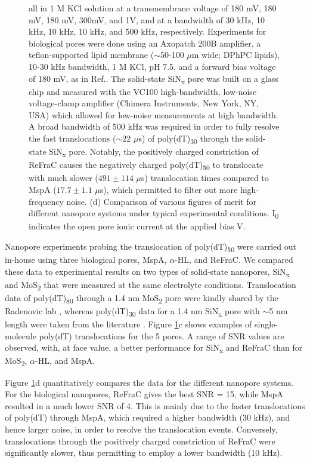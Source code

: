 \begin{figure}[H]
{		all in 1 M KCl solution at a transmembrane voltage of 180 mV, 180 mV, 180 mV, 300mV, and 1V, and at a bandwidth of 30 kHz, 10 kHz, 10 kHz, 10 kHz,  and 500 kHz, respectively. Experiments for biological pores were done using an Axopatch 200B amplifier, a teflon-supported lipid membrane ($\sim$50-100 $\mu$m wide; DPhPC lipids), 10-30 kHz bandwidth, 1 M KCl, pH 7.5, and a forward bias voltage of 180 mV, as in Ref.\cite{Butler2008}. The solid-state SiN\textsubscript{x} pore was built on a glass chip and measured with the VC100 high-bandwidth, low-noise voltage-clamp amplifier (Chimera Instruments, New York, NY, USA) which allowed for low-noise measurements at high bandwidth. A broad bandwidth of 500 kHz was required in order to fully resolve the fast translocations ($\sim$22 $\mu$s) \cite{Venta2013} of poly(dT)\textsubscript{30} through the solid-state SiN\textsubscript{x} pore. Notably, the positively charged constriction of ReFraC causes the negatively charged poly(dT)\textsubscript{50} to translocate with much slower ($491\pm 114$ $\mu$s) translocation times compared to MspA ($17.7\pm 1.1$ $\mu$s), which permitted to filter out more high-frequency noise. (d) Comparison of various figures of merit for different nanopore systems under typical experimental conditions. I\textsubscript{0} indicates the open pore ionic current at the applied bias V.}
	\label{fig:fig3.4}
\end{figure}



Nanopore experiments probing the translocation of poly(dT)\textsubscript{50} were carried out in-house using three biological pores, MspA, $\alpha$-HL, and ReFraC. We compared these data to experimental results on two types of solid-state nanopores, SiN\textsubscript{x} \cite{Venta2013} and MoS\textsubscript{2}\cite{Feng2015} that were measured at the same electrolyte conditions. Translocation data of poly(dT)\textsubscript{80} through a 1.4 nm MoS\textsubscript{2} pore were kindly shared by the Radenovic lab \cite{Graf2019}, whereas poly(dT)\textsubscript{30} data for a 1.4 nm SiN\textsubscript{x} pore with $\sim$5 nm length were taken from the literature \cite{Venta2013}. Figure \ref{fig:fig3.4}c shows examples of single-molecule poly(dT) translocations for the 5 pores. A range of SNR values are observed, with, at face value, a better performance for SiN\textsubscript{x} and ReFraC than for MoS\textsubscript{2}, $\alpha$-HL, and MspA. 

Figure \ref{fig:fig3.4}d quantitatively compares the data for the different nanopore systems. 
For the biological nanopores, ReFraC gives the best SNR = 15, while MspA resulted in a much lower SNR of 4. This is mainly due to the faster translocations of poly(dT) through MspA, which required a higher bandwidth (30 kHz), and hence larger noise, in order to resolve the translocation events. Conversely, translocations through the positively charged constriction of ReFraC were significantly slower, thus permitting to employ a lower bandwidth (10 kHz). 

